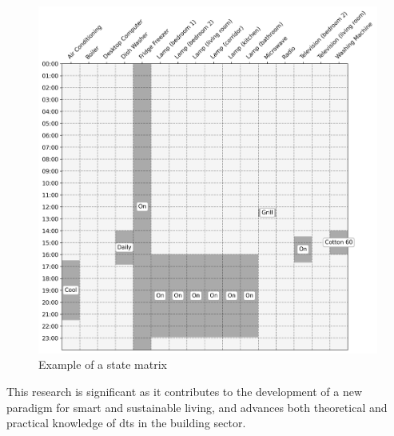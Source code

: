 \begin{figure}
    \centering
    \includegraphics[width=.55\linewidth]{images/real_matrix.png}
    \caption{Example of a state matrix}%
    \label{fig:state-matrix}
\end{figure}

This research is significant as it contributes to the development of a new paradigm for smart and sustainable living, and advances both theoretical and practical knowledge of \acrshort*{dt}s in the building sector.